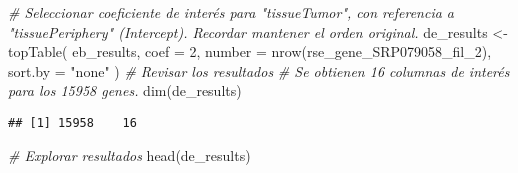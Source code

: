 \documentclass[
]{article}
\newenvironment{Shaded}{\begin{snugshade}}{\end{snugshade}}
\newcommand{\AttributeTok}[1]{\textcolor[rgb]{0.77,0.63,0.00}{#1}}
\newcommand{\CommentTok}[1]{\textcolor[rgb]{0.56,0.35,0.01}{\textit{#1}}}
\newcommand{\DecValTok}[1]{\textcolor[rgb]{0.00,0.00,0.81}{#1}}
\newcommand{\FunctionTok}[1]{\textcolor[rgb]{0.00,0.00,0.00}{#1}}
\newcommand{\NormalTok}[1]{#1}
\newcommand{\OtherTok}[1]{\textcolor[rgb]{0.56,0.35,0.01}{#1}}
\newcommand{\StringTok}[1]{\textcolor[rgb]{0.31,0.60,0.02}{#1}}
\begin{document}
\begin{Shaded}
\begin{Highlighting}[]
\CommentTok{\# Seleccionar coeficiente de interés para "tissueTumor", con referencia a "tissuePeriphery" (Intercept). Recordar mantener el orden original.}
\NormalTok{de\_results }\OtherTok{\textless{}{-}} \FunctionTok{topTable}\NormalTok{(}
\NormalTok{  eb\_results,}
  \AttributeTok{coef =} \DecValTok{2}\NormalTok{,}
  \AttributeTok{number =} \FunctionTok{nrow}\NormalTok{(rse\_gene\_SRP079058\_fil\_2),}
  \AttributeTok{sort.by =} \StringTok{"none"}
\NormalTok{)}
\CommentTok{\# Revisar los resultados}
\CommentTok{\# Se obtienen 16 columnas de interés para los 15958 genes.}
\FunctionTok{dim}\NormalTok{(de\_results)}
\end{Highlighting}
\end{Shaded}

\begin{verbatim}
## [1] 15958    16
\end{verbatim}

\begin{Shaded}
\begin{Highlighting}[]
\CommentTok{\# Explorar resultados}
\FunctionTok{head}\NormalTok{(de\_results)}
\end{Highlighting}
\end{Shaded}
\end{document}
